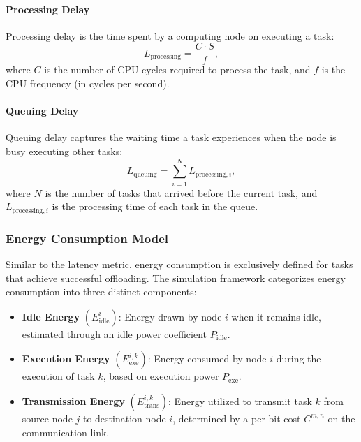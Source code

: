 \documentclass[preprint,12pt]{elsarticle}
\begin{document}
\paragraph{Processing Delay}
Processing delay is the time spent by a computing node on executing a task:
\begin{equation}
L_{\text{processing}} = \frac{C \cdot S}{f},
\end{equation}
where \( C \) is the number of CPU cycles required to process the task, and \( f \) is the CPU frequency (in cycles per second).

\paragraph{Queuing Delay}
Queuing delay captures the waiting time a task experiences when the node is busy executing other tasks:
\begin{equation}
L_{\text{queuing}} = \sum_{i=1}^{N} L_{\text{processing}, i},
\end{equation}
where \( N \) is the number of tasks that arrived before the current task, and \( L_{\text{processing}, i} \) is the processing time of each task in the queue.

\subsubsection{Energy Consumption Model}
\label{subsec:energy_consumption}

Similar to the latency metric, energy consumption is exclusively defined for tasks that achieve successful offloading. The simulation framework categorizes energy consumption into three distinct components:

\begin{itemize}
    \item \textbf{Idle Energy} $(E_{\text{idle}}^{i})$: Energy drawn by node $i$ when it remains idle, estimated through an idle power coefficient $P_{\text{idle}}$.
    \item \textbf{Execution Energy} $(E_{\text{exe}}^{i,k})$: Energy consumed by node $i$ during the execution of task $k$, based on execution power $P_{\text{exe}}$.
    \item \textbf{Transmission Energy} $(E_{\text{trans}}^{i,k})$: Energy utilized to transmit task $k$ from source node $j$ to destination node $i$, determined by a per-bit cost $C^{m,n}$ on the communication link.
\end{itemize}
\end{document}

